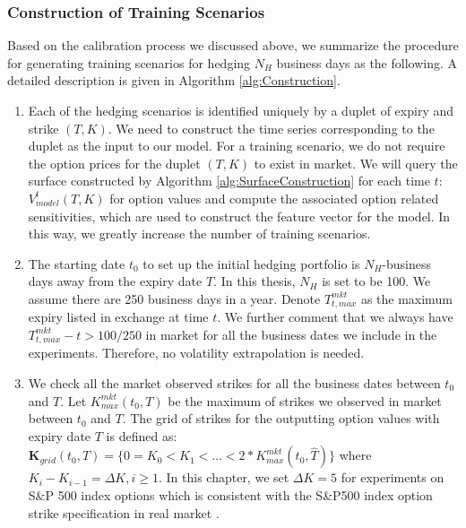 \documentclass[letterpaper,12pt,titlepage,oneside,final]{book}
\numberwithin{equation}{section}
\theoremstyle{definition}
\begin{document}
\subsubsection{Construction of Training Scenarios}
Based on the calibration process we discussed above, we summarize the procedure for generating training scenarios for hedging $N_H$ business days as the following. A detailed description is given in Algorithm \ref{alg:Construction}.
\begin{enumerate}
	\item Each of the hedging scenarios is identified uniquely by a duplet of expiry and strike  $(T,K)$. We need to construct the time series corresponding to the duplet as the input to our model. For a training scenario, we do not require the option prices for the  duplet $(T,K)$ to exist in market. We will query the surface constructed by Algorithm \ref{alg:SurfaceConstruction} for each time $t$: $V_{model}^t(T,K)$ for option values and compute the associated option related sensitivities, which are used to construct the feature vector for the model. In this way, we greatly increase the number of training scenarios.  
	\item The starting date $t_0$ to set up the initial hedging portfolio is  $N_H$-business days away from the expiry date $T$. In this thesis,  $N_H$ is set to be 100.  We assume there are 250 business days in a year. Denote $T_{t,max}^{mkt}$ as the maximum expiry listed in exchange at time $t$. We further comment that we always have $T_{t,max}^{mkt}-t>100/250$ in market for all the business dates we include in the experiments.  Therefore, no volatility extrapolation is needed.
	\item We check all the market observed strikes for all the business dates between $t_0$ and  $T$. Let $K^{mkt}_{max}(t_0,T)$ be the maximum of  strikes we observed in market  between $t_0$ and  $T$. The grid of strikes for the outputting option values with expiry date $T$ is defined as: $\mathbf{K}_{grid}(t_0,{T})=\{0=K_0<K_1<\dots<2*K^{mkt}_{max}(t_0,\widehat{T})\}$ where $K_i-K_{i-1}=\Delta K, i \geq 1$. In this chapter, we set $\Delta K=5$ for experiments on S\&P 500 index options which is consistent with the S\&P500 index option strike specification in real market \cite{hull2006options}.
\end{enumerate}
\end{document}
